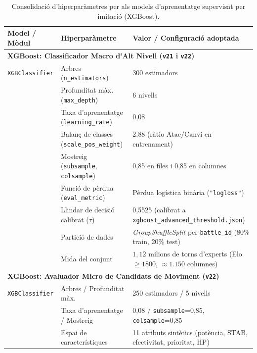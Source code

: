 \begin{table}[htbp]
\centering
\caption{Consolidació d'hiperparàmetres per als models d'aprenentatge supervisat per imitació (XGBoost).}
\label{tab:app_hyperparameters_il}
\footnotesize
\renewcommand{\arraystretch}{1.15}
\begin{tabularx}{\textwidth}{l>{\raggedright\arraybackslash}p{3.5cm}X}
\toprule
\textbf{Model / Mòdul} & \textbf{Hiperparàmetre} & \textbf{Valor / Configuració adoptada} \\
\midrule
\multicolumn{3}{l}{\textbf{XGBoost: Classificador Macro d'Alt Nivell (\texttt{v21} i \texttt{v22})}} \\
\midrule
\texttt{XGBClassifier} & Arbres (\texttt{n\_estimators}) & 300 estimadors \\
& Profunditat màx. (\texttt{max\_depth}) & 6 nivells \\
& Taxa d'aprenentatge (\texttt{learning\_rate}) & 0,08 \\
& Balanç de classes (\texttt{scale\_pos\_weight}) & 2,88 (ràtio $\text{Atac} / \text{Canvi}$ en entrenament) \\
& Mostreig (\texttt{subsample}, \texttt{colsample}) & 0,85 en files i 0,85 en columnes \\
& Funció de pèrdua (\texttt{eval\_metric}) & Pèrdua logística binària (\texttt{"logloss"}) \\
& Llindar de decisió calibrat ($\tau$) & 0,5525 (calibrat a \texttt{xgboost\_advanced\_threshold.json}) \\
& Partició de dades & \textit{GroupShuffleSplit} per \texttt{battle\_id} (80\% train, 20\% test) \\
& Mida del conjunt & $1{,}12$ milions de torns d'experts (Elo $\ge 1800$, $\approx 1.150$ columnes) \\
\midrule
\multicolumn{3}{l}{\textbf{XGBoost: Avaluador Micro de Candidats de Moviment (\texttt{v22})}} \\
\midrule
\texttt{XGBClassifier} & Arbres / Profunditat màx. & 250 estimadors / 5 nivells \\
& Taxa d'aprenentatge / Mostreig & 0,08 / \texttt{subsample}=0,85, \texttt{colsample}=0,85 \\
& Espai de característiques & 11 atributs sintètics (potència, STAB, efectivitat, prioritat, HP) \\
\bottomrule
\end{tabularx}
\end{table}

